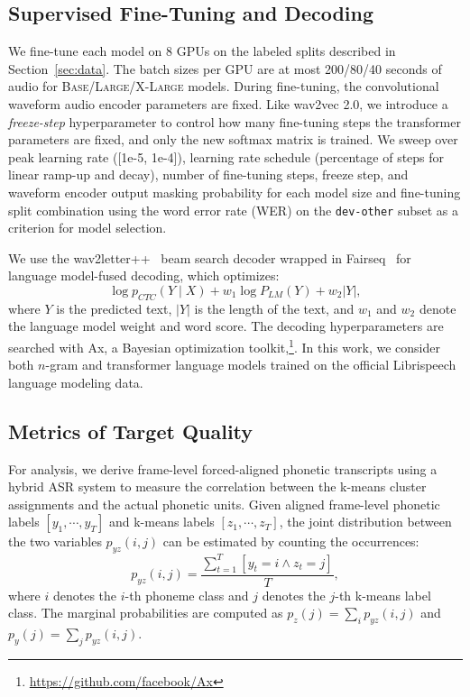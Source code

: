 \subsection{Supervised Fine-Tuning and Decoding}
We fine-tune each model on 8 GPUs on the labeled splits described in Section~\ref{sec:data}. The batch sizes per GPU are at most 200/80/40 seconds of audio for \textsc{Base}/\textsc{Large}/\textsc{X-Large} models. During fine-tuning, the convolutional waveform audio encoder parameters are fixed. Like wav2vec 2.0, we introduce a \textit{freeze-step} hyperparameter to control how many fine-tuning steps the transformer parameters are fixed, and only the new softmax matrix is trained. 
We sweep over peak learning rate ([1e-5, 1e-4]), learning rate schedule (percentage of steps for linear ramp-up and decay), number of fine-tuning steps, freeze step, and waveform encoder output masking probability for each model size and fine-tuning split combination using the word error rate (WER) on the \texttt{dev-other} subset as a criterion for model selection.

We use the wav2letter++~\cite{pratap2018wav2letter++} beam search decoder wrapped in Fairseq~\cite{ott2019fairseq} for language model-fused decoding, which optimizes:
\begin{equation}
    \log p_{CTC}(Y \mid X) + w_1 \log P_{LM}(Y) + w_2 |Y|,
\end{equation}
where $Y$ is the predicted text, $|Y|$ is the length of the text, and $w_1$ and $w_2$ denote the language model weight and word score. The decoding hyperparameters are searched with Ax, a Bayesian optimization toolkit,\footnote{\url{https://github.com/facebook/Ax}}. In this work, we consider both $n$-gram and transformer language models trained on the official Librispeech language modeling data.

\subsection{Metrics of Target Quality}
For analysis, we derive frame-level forced-aligned phonetic transcripts using a hybrid ASR system to measure the correlation between the k-means cluster assignments and the actual phonetic units. 
Given aligned frame-level phonetic labels $[y_1, \cdots, y_T]$ and k-means labels $[z_1, \cdots, z_T]$, the joint distribution between the two variables $p_{yz}(i, j)$ can be estimated by counting the occurrences: 
\begin{equation}
    p_{yz}(i, j) = \dfrac{\sum_{t=1}^T [y_t = i \wedge z_t = j] }{T},
\end{equation}
where $i$ denotes the $i$-th phoneme class and $j$ denotes the $j$-th k-means label class.
The marginal probabilities are computed as $p_z(j) = \sum_i p_{yz}(i, j)$ and $p_y(j) = \sum_j p_{yz}(i, j)$.

